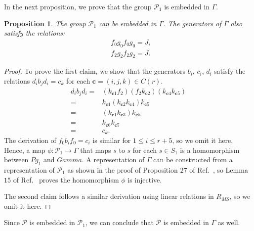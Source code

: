 \documentclass[11pt,letterpaper]{article}
\newcommand{\1}{\mathbb{1}}
\newcommand{\Pg}{\mathcal{P}}
\newcommand{\bc}{\pmb{c}}
\newtheorem{proposition}[theorem]{Proposition}
\theoremstyle{definition}
\begin{document}
In the next proposition, we prove that the group $\Pg_1$ is embedded in $\Gamma$.
\begin{proposition}
    \label{prop:g1gamma}
	The group $\Pg_1$ can be embedded in $\Gamma$.
	The generators of $\Gamma$ also satisfy the relations: 
	\begin{align}
	    \label{eq:mg1} &f_0 g_0 f_0 g_0 = J,\\
	    \label{eq:mg2} &f_2 g_2 f_2 g_2 = J.
	\end{align}
\end{proposition}
\begin{proof}
    To prove the first claim, we show that the generators
    $b_i$, $c_i$, $d_i$ satisfy the relations
    $d_ib_jd_i = c_k$ for each $\bc = (i,j,k) \in C(r)$.
    \begin{align*}
        d_ib_jd_i =& (k_{\bc 1} f_2)(f_2 k_{\bc 2})(k_{\bc 4} k_{\bc 5})\\ 
        =& k_{\bc 1}(k_{\bc 2}k_{\bc 4})k_{\bc 5} \\
        =& (k_{\bc 1} k_{\bc 3}) k_{\bc 5} \\
        =& k_{\bc 6} k_{\bc 5} \\
        =& c_k.
    \end{align*}
    The derivation of $f_0 b_i f_0 = c_i$ is similar for $1 \leq i \leq r+5$, so we omit it here.
    Hence, a map $\phi:\Pg_1 \rightarrow \Gamma$ that maps $s$
    to $s$ for each $s \in S_1$ is a homomorphism between $Pg_1$ and 
    $Gamma$. 
    A representation of $\Gamma$ can be constructed from a representation 
    of $\Pg_1$ as shown in the proof of Proposition $27$ of Ref.~\cite{slofstra2017},
    so Lemma $15$ of Ref.~\cite{slofstra2017} proves the homomorphism $\phi$
    is injective.
    
    The second claim follows a similar derivation
    using linear relations in $R_{MS}$, so we omit it here.
\end{proof}
Since $\Pg$ is embedded in $\Pg_1$, we can conclude that
$\Pg$ is embedded in $\Gamma$ as well.
\end{document}
